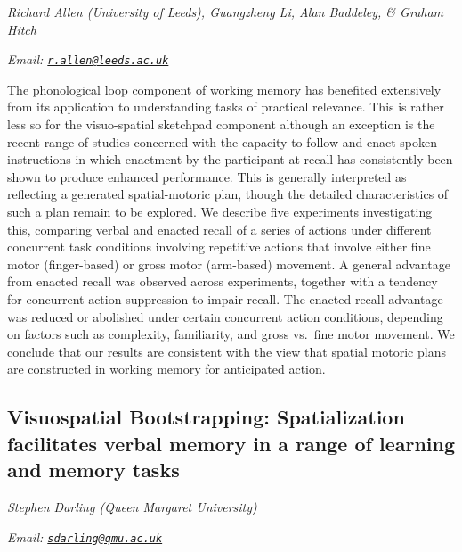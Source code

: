 \documentclass[
  12pt,
]{book}
\begin{document}
\emph{Richard Allen (University of Leeds), Guangzheng Li, Alan Baddeley, \& Graham Hitch}

\emph{Email: \href{mailto:r.allen@leeds.ac.uk}{\nolinkurl{r.allen@leeds.ac.uk}}}

The phonological loop component of working memory has benefited extensively from its application to understanding tasks of practical relevance. This is rather less so for the visuo-spatial sketchpad component although an exception is the recent range of studies concerned with the capacity to follow and enact spoken instructions in which enactment by the participant at recall has consistently been shown to produce enhanced performance. This is generally interpreted as reflecting a generated spatial-motoric plan, though the detailed characteristics of such a plan remain to be explored. We describe five experiments investigating this, comparing verbal and enacted recall of a series of actions under different concurrent task conditions involving repetitive actions that involve either fine motor (finger-based) or gross motor (arm-based) movement. A general advantage from enacted recall was observed across experiments, together with a tendency for concurrent action suppression to impair recall. The enacted recall advantage was reduced or abolished under certain concurrent action conditions, depending on factors such as complexity, familiarity, and gross vs.~fine motor movement. We conclude that our results are consistent with the view that spatial motoric plans are constructed in working memory for anticipated action.

\hypertarget{visuospatial-bootstrapping-spatialization-facilitates-verbal-memory-in-a-range-of-learning-and-memory-tasks}{%
\subsection{Visuospatial Bootstrapping: Spatialization facilitates verbal memory in a range of learning and memory tasks}\label{visuospatial-bootstrapping-spatialization-facilitates-verbal-memory-in-a-range-of-learning-and-memory-tasks}}

\emph{Stephen Darling (Queen Margaret University)}

\emph{Email: \href{mailto:sdarling@qmu.ac.uk}{\nolinkurl{sdarling@qmu.ac.uk}}}
\end{document}
